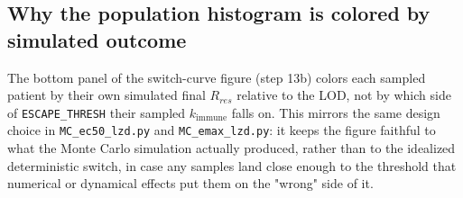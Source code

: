 \documentclass[11pt]{article}
\begin{document}
\subsection{Why the population histogram is colored by simulated outcome}

The bottom panel of the switch-curve figure (step 13b) colors each sampled
patient by their own simulated final $R_{res}$ relative to the LOD, not by
which side of \texttt{ESCAPE\_THRESH} their sampled $k_{\mathrm{immune}}$
falls on. This mirrors the same design choice in \texttt{MC\_ec50\_lzd.py}
and \texttt{MC\_emax\_lzd.py}: it keeps the figure faithful to what the
Monte Carlo simulation actually produced, rather than to the idealized
deterministic switch, in case any samples land close enough to the threshold
that numerical or dynamical effects put them on the "wrong" side of it.
\end{document}
